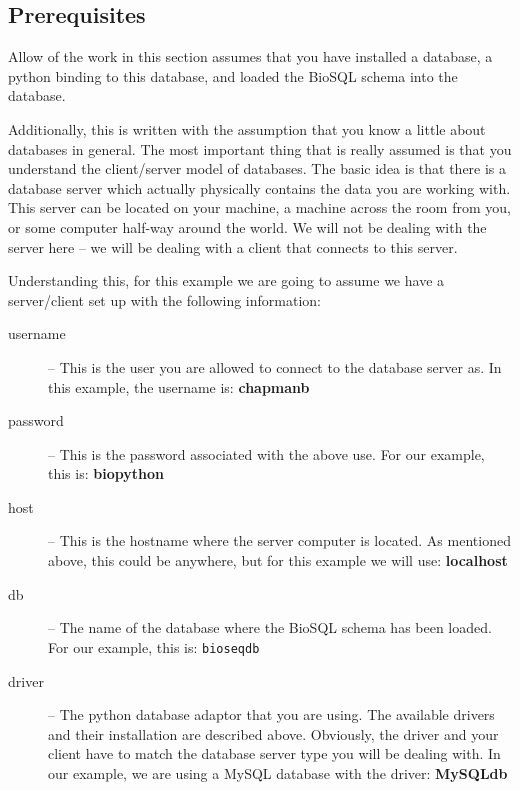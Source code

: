 \documentclass{article}
\begin{document}
\subsection{Prerequisites}

Allow of the work in this section assumes that you have installed a
database, a python binding to this database, and loaded the BioSQL
schema into the database. 


Additionally, this is written with the assumption that you know a little
about databases in general. The most important thing that is really
assumed is that you understand the client/server model of databases. The
basic idea is that there is a database server which actually physically
contains the data you are working with. This server can be located on
your machine, a machine across the room from you, or some computer
half-way around the world. We will not be dealing with the server here
-- we will be dealing with a client that connects to this server. 


Understanding this, for this example we are going to assume we have a
server/client set up with the following information:

\begin{description}
  \item[username] -- This is the user you are allowed to connect to the
  database server as. In this example, the username is:
  \textbf{chapmanb}

  \item[password] -- This is the password associated with the above use.
  For our example, this is: \textbf{biopython}

  \item[host] -- This is the hostname where the server computer is
  located. As mentioned above, this could be anywhere, but for this
  example we will use: \textbf{localhost}

  \item[db] -- The name of the database where the BioSQL schema has been
  loaded. For our example, this is: \verb|bioseqdb|

  \item[driver] -- The python database adaptor that you are using. The
  available drivers and their installation are described above.
  Obviously, the driver and your client have to match the database
  server type you will be dealing with. In our example, we are using a
  MySQL database with the driver: \textbf{MySQLdb}
  
\end{description}
\end{document}
